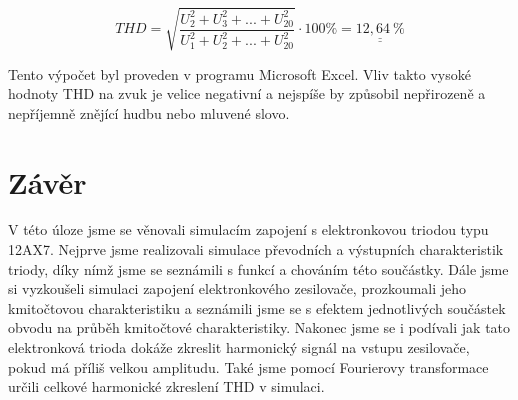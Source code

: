\documentclass[a4paper, czech]{article}
\begin{document}
\begin{equation*}
    THD = \sqrt{\frac{U_2^2 + U_3^2 + ... + U_{20}^2}{U_1^2 + U_2^2 + ... + U_{20}^2}} \cdot 100 \% = \underline{\underline{12,64\ \%}}
\end{equation*}

Tento výpočet byl proveden v programu Microsoft Excel.
Vliv takto vysoké hodnoty THD na zvuk je velice negativní a nejspíše by způsobil nepřirozeně a nepříjemně znějící hudbu nebo mluvené slovo.

\section{Závěr}

V této úloze jsme se věnovali simulacím zapojení s elektronkovou triodou typu 12AX7.
Nejprve jsme realizovali simulace převodních a výstupních charakteristik triody, díky nímž jsme se seznámili s funkcí a chováním této součástky.
Dále jsme si vyzkoušeli simulaci zapojení elektronkového zesilovače, prozkoumali jeho kmitočtovou charakteristiku a seznámili jsme se s efektem jednotlivých součástek obvodu na průběh kmitočtové charakteristiky.
Nakonec jsme se i podívali jak tato elektronková trioda dokáže zkreslit harmonický signál na vstupu zesilovače, pokud má příliš velkou amplitudu.
Také jsme pomocí Fourierovy transformace určili celkové harmonické zkreslení THD v simulaci.
\end{document}
